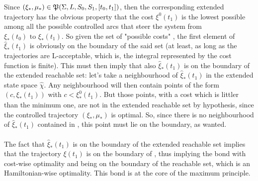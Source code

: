  Since $(\xi_*,\mu_*)\in\mathfrak{P}(\Sigma,L,S_0,S_1,[t_0,t_1])$, then the corresponding extended trajectory has the obvious property that the cost $\xi^0(t_1)$ is the lowest possible among all the possible controlled arcs \controlledTraj that steer the system from $\xi_*(t_0)\text{ to }\xi_*(t_1)$. So given the set of "possible costs" , the first element of $\hat{\xi}_*(t_1)$ is obviously on the boundary of the said set (at least, as long as the trajectories are L-acceptable, which is, the integral represented by the cost function is finite). This must then imply that also $\hat{\xi}_*(t_1)$ is on the boundary of the extended reachable set: let's take a neighbourhood of $\hat{\xi}_*(t_1)$ in the extended state space $\hat{\chi}$. Any neighbourhood will then contain points of the form $(c,\xi_*(t_1))$ with $c<\xi_*^0(t_1)$. But those points, with a cost which is littler than the minimum one, are not in the extended reachable set by hypothesis, since the controlled trajectory  $(\xi_*,\mu_*)$ is optimal. So, since there is no neighbourhood of $\hat{\xi}_*(t_1)$ contained in , this point must lie on the boundary, as wanted.\\\\


The fact that $\hat{\xi}_*(t_1)$ is on the boundary of the extended reachable set implies that the trajectory $\xi(t_1)$ is on the boundary of , thus implying the bond with cost-wise optimality and being on the boundary of the reachable set, which is an Hamiltonian-wise optimality. This bond is at the core of the maximum principle. 
